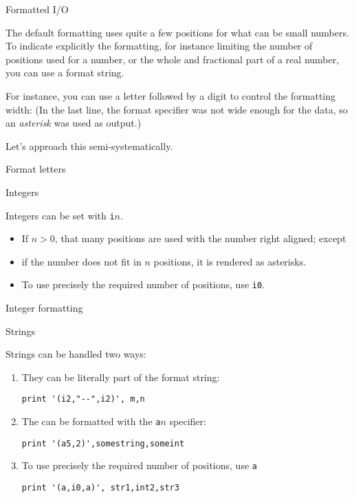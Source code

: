  {Formatted I/O}
\label{sec:fformat}

The default formatting uses quite a few positions for what can be
small numbers. To indicate explicitly the formatting, for instance
limiting the number of positions used for a number, or the whole and
fractional part of a real number, you can use a format string.

For instance, you can use a letter followed by a digit to control the
formatting width:
%
%
(In the last line, the format specifier was not wide enough for the
data, so an
\emph{asterisk}
was used as output.)

Let's approach this semi-systematically.

 {Format letters}

 {Integers}

Integers can be set with \lstinline{i}$n$.
\begin{itemize}
\item If $n>0$, that many positions are used
  with the number right aligned; except
\item if the number does not fit in $n$ positions,
  it is rendered as asterisks.
\item To use precisely the required number of positions,
  use \lstinline{i0}.
\end{itemize}

\begin{block}{Integer formatting}
  \label{sl:f-format-i}
\end{block}

 {Strings}

Strings can be handled two ways: 
\begin{enumerate}
\item They can be literally part of the format string:
\begin{lstlisting}
print '(i2,"--",i2)', m,n
\end{lstlisting}
\item The can be formatted with the \lstinline{a}$n$ specifier:
\begin{lstlisting}
print '(a5,2)',somestring,someint
\end{lstlisting}
\item To use precisely the required number of positions,
  use \lstinline{a}
\begin{lstlisting}
print '(a,i0,a)', str1,int2,str3
\end{lstlisting}
\end{enumerate}


